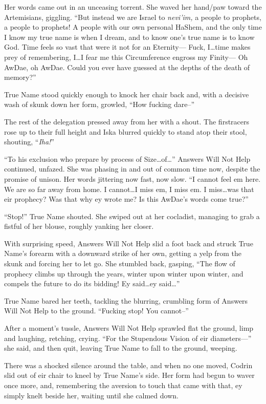 Her words came out in an unceasing torrent. She waved her hand/paw toward the Artemisians, giggling. ``But instead we are Israel to \emph{nevi'im,} a people to prophets, a people to prophets! A people with our own personal HaShem, and the only time I know my true name is when I dream, and to know one's true name is to know God. Time feels so vast that were it not for an Eternity— Fuck, I\ldots time makes prey of remembering, I\ldots I fear me this Circumference engross my Finity— Oh AwDae, oh AwDae. Could you ever have guessed at the depths of the death of memory?''

True Name stood quickly enough to knock her chair back and, with a decisive wash of skunk down her form, growled, ``How fucking dare--''

The rest of the delegation pressed away from her with a shout. The firstracers rose up to their full height and Iska blurred quickly to stand atop their stool, shouting, ``\emph{Iha!}''

``To his exclusion who prepare by process of Size\ldots of\ldots{}'' Answers Will Not Help continued, unfazed. She was phasing in and out of common time now, despite the promise of unison. Her words jittering now fast, now slow. ``I cannot feel em here. We are so far away from home. I cannot\ldots I miss em, I miss em. I miss\ldots was that eir prophecy? Was that why ey wrote me? Is this AwDae's words come true?''

``Stop!'' True Name shouted. She swiped out at her cocladist, managing to grab a fistful of her blouse, roughly yanking her closer.

With surprising speed, Answers Will Not Help slid a foot back and struck True Name's forearm with a downward strike of her own, getting a yelp from the skunk and forcing her to let go. She stumbled back, gasping, ``The flow of prophecy climbs up through the years, winter upon winter upon winter, and compels the future to do its bidding! Ey said\ldots ey said\ldots{}''

True Name bared her teeth, tackling the blurring, crumbling form of Answers Will Not Help to the ground. ``Fucking stop! You cannot--''

After a moment's tussle, Answers Will Not Help sprawled flat the ground, limp and laughing, retching, crying. ``For the Stupendous Vision of eir diameters—'' she said, and then quit, leaving True Name to fall to the ground, weeping.

There was a shocked silence around the table, and when no one moved, Codrin slid out of eir chair to kneel by True Name's side. Her form had begun to waver once more, and, remembering the aversion to touch that came with that, ey simply knelt beside her, waiting until she calmed down.

